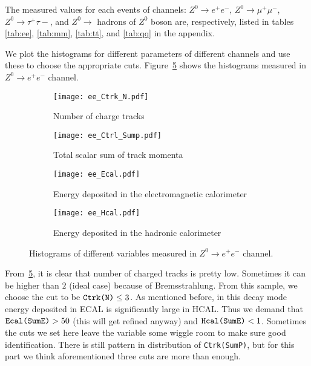 The measured values for each events of channels: $ {Z}^0\rightarrow e^+e^- $, $ {Z}^0\rightarrow \mu^+\mu^- $, $ {Z}^0\rightarrow \tau^+\tau-$,  and $ {Z}^0\rightarrow  $ hadrons of $ Z^0 $ boson are, respectively, listed in tables \ref{tab:ee}, \ref{tab:mm}, \ref{tab:tt}, and \ref{tab:qq} in the appendix.

We plot the histograms for different parameters of different channels and use these to choose the appropriate cuts. Figure~\ref{Fig:histograms_ee} shows the histograms measured in $  {Z}^0\rightarrow e^+e^- $ channel.  
\begin{figure}[H]  
	\begin{subfigure}[t]{0.5\textwidth}
	\begin{center}
		\texttt{[image: ee\_Ctrk\_N.pdf]}
	\end{center}
	\caption{Number of charge tracks}
	\label{fig:}
	\end{subfigure}%
	\begin{subfigure}[t]{0.5\textwidth}
	\begin{center}
		\texttt{[image: ee\_Ctrl\_Sump.pdf]}
	\end{center}
	\caption{Total scalar sum of track momenta}
	\label{fig:}
	\end{subfigure}
	
	\begin{subfigure}[t]{0.5\textwidth}
	\begin{center}
		\texttt{[image: ee\_Ecal.pdf]}
	\end{center}
	\caption{Energy deposited in the electromagnetic calorimeter}
	\label{fig:}
	\end{subfigure}%
	\begin{subfigure}[t]{0.5\textwidth}
	\begin{center}
		\texttt{[image: ee\_Hcal.pdf]}
	\end{center}
	\caption{Energy deposited in the hadronic calorimeter}
	\label{fig:}
	\end{subfigure}
	\caption{Histograms of different variables measured in $  {Z}^0\rightarrow e^+e^- $ channel. }
\label{Fig:histograms_ee}	
\end{figure}
From~\ref{Fig:histograms_ee}, it is clear that number of charged tracks is pretty low. Sometimes it can be higher than $2$ (ideal case) because of Bremsstrahlung. From this sample, we choose the cut to be $\verb|Ctrk(N)| \leq 3$. As mentioned before, in this decay mode energy deposited in ECAL is significantly large in HCAL. Thus we demand that $\verb|Ecal(SumE)| > 50$ (this will get refined anyway) and $\verb|Hcal(SumE)| < 1$. Sometimes the cuts we set here leave the variable some wiggle room to make sure good identification. There is still pattern in distribution of \verb|Ctrk(SumP)|, but for this part we think aforementioned three cuts are more than enough.

